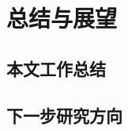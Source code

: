 \chapter{总结与展望}\label{chap:Summary} 

\section{本文工作总结}\label{sec:result_analysis}

\section{下一步研究方向}\label{sec:TODOs}
